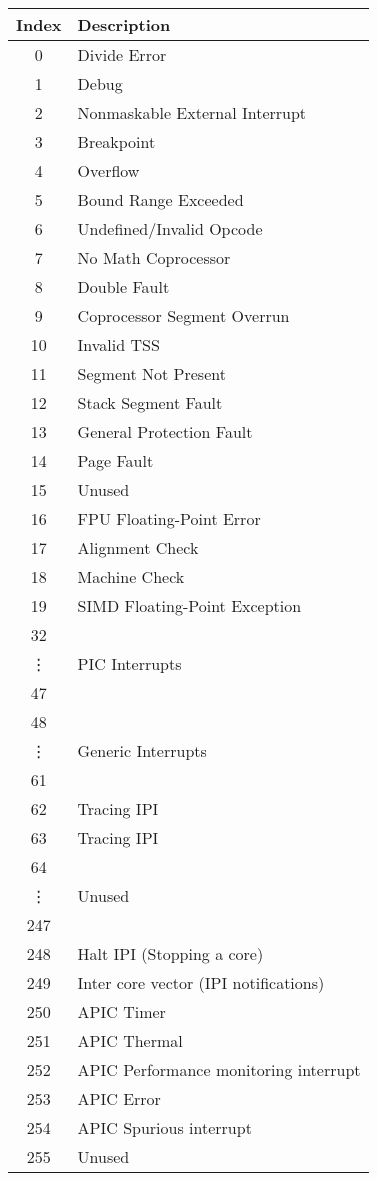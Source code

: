 \documentclass[a4paper,11pt,twoside]{report}
\begin{document}
{{\begin{tabular}{c|l}
    Index & Description \\ \hline
    0  &  Divide Error \\
    1  &  Debug \\
    2  &  Nonmaskable External Interrupt \\
    3  &  Breakpoint \\
    4  &  Overflow \\
    5  &  Bound Range Exceeded \\
    6  &  Undefined/Invalid Opcode \\
    7  &  No Math Coprocessor \\
    8  &  Double Fault \\
    9  &  Coprocessor Segment Overrun \\
    10 &  Invalid TSS \\
    11 &  Segment Not Present \\
    12 &  Stack Segment Fault \\
    13 &  General Protection Fault \\
    14 &  Page Fault \\
    15 &  Unused \\
    16 &  FPU Floating-Point Error \\
    17 &  Alignment Check \\
    18 &  Machine Check \\
    19 &  SIMD Floating-Point Exception \\
    \hline
    32 & \multirow{3}{*}{PIC Interrupts} \\
    \vdots{} & \\
    47 & \\
    \hline
    48 & \multirow{3}{*}{Generic Interrupts} \\
    \vdots{} & \\
    61 & \\
    \hline
    62 & Tracing IPI \\
    63 & Tracing IPI \\
    \hline
    64 & \multirow{3}{*}{Unused} \\
    \vdots{} & \\
    247 & \\
    \hline
    248 & Halt IPI (Stopping a core) \\
    249 & Inter core vector (IPI notifications) \\
    250 & APIC Timer \\
    251 & APIC Thermal \\
    252 & APIC Performance monitoring interrupt \\
    253 & APIC Error \\
    254 & APIC Spurious interrupt \\
    255 & Unused \\
\end{tabular}

}}
\end{document}
